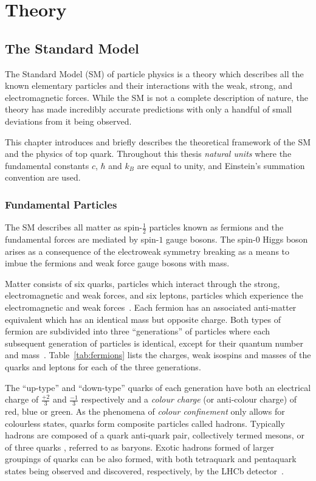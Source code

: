 \chapter{Theory}\label{chapter:theory}
\section{The Standard Model}\label{sec:sm}
The Standard Model (SM) of particle physics is a theory which describes all the known elementary particles and their interactions with the weak, strong, and electromagnetic forces.
While the SM is not a complete description of nature, the theory has made incredibly accurate predictions with only a handful of small deviations from it being observed.

This chapter introduces and briefly describes the theoretical framework of the SM and the physics of top quark.
Throughout this thesis \emph{natural units} where the fundamental constants $c$, $\hbar$ and $k_{B}$ are equal to unity, and Einstein's summation convention are used.

\subsection{Fundamental Particles}\label{subsec:particles}
The SM describes all matter as spin-$\frac{1}{2}$ particles known as fermions and the fundamental forces are mediated by spin-$1$ gauge bosons.
The spin-$0$ Higgs boson arises as a consequence of the electroweak symmetry breaking as a means to imbue the fermions and weak force gauge bosons with mass.

Matter consists of six quarks, particles which interact through the strong, electromagnetic and weak forces, and six leptons, particles which experience the electromagnetic and weak forces~\cite{LagrangiansSM}.
Each fermion has an associated anti-matter equivalent which has an identical mass but opposite charge.
Both types of fermion are subdivided into three ``generations'' of particles where each subsequent generation of particles is identical, except for their quantum number and mass~\cite{ElectroweakStrong}.
Table~\ref{tab:fermions} lists the charges, weak isospins and masses of the quarks and leptons for each of the three generations.

The ``up-type'' and ``down-type'' quarks of each generation have both an electrical charge of $\frac{+2}{3}$ and $\frac{-1}{3}$  respectively and a \emph{colour charge} (or anti-colour charge) of red, blue or green.
As the phenomena of \emph{colour confinement} only allows for colourless states, quarks form composite particles called hadrons.
Typically hadrons are composed of a quark anti-quark pair, collectively termed mesons, or of three quarks , referred to as baryons.
Exotic hadrons formed of larger groupings of quarks can be also formed, with both tetraquark and pentaquark states being observed and discovered, respectively, by the LHCb detector~\cite{Aaij:2014jqa,Aaij:2015tga}.

